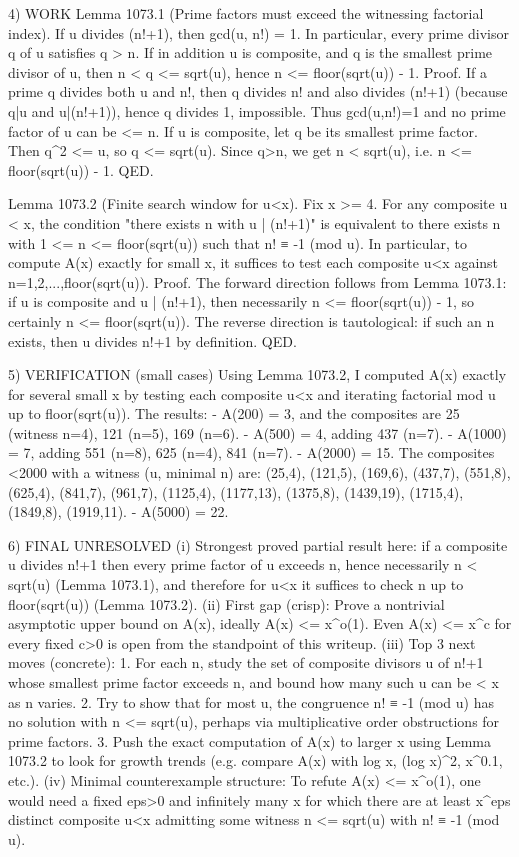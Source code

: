 4) WORK
Lemma 1073.1 (Prime factors must exceed the witnessing factorial index).
If u divides (n!+1), then gcd(u, n!) = 1. In particular, every prime divisor q of u satisfies q > n.
If in addition u is composite, and q is the smallest prime divisor of u, then n < q <= sqrt(u), hence n <= floor(sqrt(u)) - 1.
Proof. If a prime q divides both u and n!, then q divides n! and also divides (n!+1) (because q|u and u|(n!+1)), hence q divides 1, impossible. Thus gcd(u,n!)=1 and no prime factor of u can be <= n.
If u is composite, let q be its smallest prime factor. Then q^2 <= u, so q <= sqrt(u). Since q>n, we get n < sqrt(u), i.e. n <= floor(sqrt(u)) - 1. QED.

Lemma 1073.2 (Finite search window for u<x).
Fix x >= 4. For any composite u < x, the condition "there exists n with u | (n!+1)" is equivalent to
  there exists n with 1 <= n <= floor(sqrt(u)) such that n! ≡ -1 (mod u).
In particular, to compute A(x) exactly for small x, it suffices to test each composite u<x against n=1,2,...,floor(sqrt(u)).
Proof. The forward direction follows from Lemma 1073.1: if u is composite and u | (n!+1), then necessarily n <= floor(sqrt(u)) - 1, so certainly n <= floor(sqrt(u)).
The reverse direction is tautological: if such an n exists, then u divides n!+1 by definition. QED.

5) VERIFICATION (small cases)
Using Lemma 1073.2, I computed A(x) exactly for several small x by testing each composite u<x and iterating factorial mod u up to floor(sqrt(u)). The results:
- A(200) = 3, and the composites are 25 (witness n=4), 121 (n=5), 169 (n=6).
- A(500) = 4, adding 437 (n=7).
- A(1000) = 7, adding 551 (n=8), 625 (n=4), 841 (n=7).
- A(2000) = 15. The composites <2000 with a witness (u, minimal n) are:
  (25,4), (121,5), (169,6), (437,7), (551,8), (625,4), (841,7), (961,7), (1125,4), (1177,13),
  (1375,8), (1439,19), (1715,4), (1849,8), (1919,11).
- A(5000) = 22.

6) FINAL
UNRESOLVED
(i) Strongest proved partial result here: if a composite u divides n!+1 then every prime factor of u exceeds n, hence necessarily n < sqrt(u) (Lemma 1073.1), and therefore for u<x it suffices to check n up to floor(sqrt(u)) (Lemma 1073.2).
(ii) First gap (crisp): Prove a nontrivial asymptotic upper bound on A(x), ideally A(x) <= x^{o(1)}. Even A(x) <= x^c for every fixed c>0 is open from the standpoint of this writeup.
(iii) Top 3 next moves (concrete):
  1. For each n, study the set of composite divisors u of n!+1 whose smallest prime factor exceeds n, and bound how many such u can be < x as n varies.
  2. Try to show that for most u, the congruence n! ≡ -1 (mod u) has no solution with n <= sqrt(u), perhaps via multiplicative order obstructions for prime factors.
  3. Push the exact computation of A(x) to larger x using Lemma 1073.2 to look for growth trends (e.g. compare A(x) with log x, (log x)^2, x^0.1, etc.).
(iv) Minimal counterexample structure: To refute A(x) <= x^{o(1)}, one would need a fixed eps>0 and infinitely many x for which there are at least x^eps distinct composite u<x admitting some witness n <= sqrt(u) with n! ≡ -1 (mod u).




